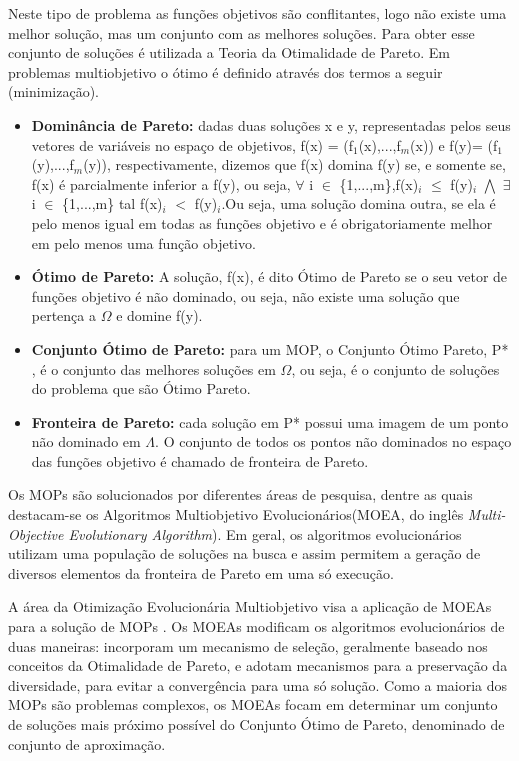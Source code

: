 Neste tipo de problema as funções objetivos são conflitantes, logo não existe uma melhor solução, mas um conjunto com as melhores soluções. Para obter esse conjunto de soluções é utilizada a Teoria da Otimalidade de Pareto\cite{coello2007evolutionary}. Em problemas multiobjetivo o ótimo é definido através dos termos a seguir (minimização).
 \begin{itemize}
   \item \textbf{Dominância de Pareto:} dadas duas soluções x e y, representadas pelos seus vetores de variáveis no espaço de objetivos, f(x) = (f$_{1}$(x),...,f$_{m}$(x)) e f(y)= (f$_{1}$(y),...,f$_{m}$(y)), respectivamente, dizemos que f(x) domina f(y) se, e somente se, f(x) é parcialmente inferior a f(y), ou seja, $\forall$ i $\in$ \{1,...,m\},f(x)$_{i}$ $\leq$ f(y)$_{i}$ $\bigwedge$  $\exists$ i $\in$ \{1,...,m\} tal  f(x)$_{i}$ $<$ f(y)$_{i}$.Ou seja, uma solução domina outra, se ela é pelo menos igual em todas as funções objetivo e é obrigatoriamente melhor em pelo menos uma função objetivo. 
   \item \textbf{Ótimo de Pareto:} A solução, f(x), é dito Ótimo de Pareto se o seu vetor de funções objetivo é não dominado, ou seja, não existe uma solução que pertença a $\Omega$ e domine f(y).
   \item \textbf{Conjunto Ótimo de Pareto:} para um MOP, o Conjunto Ótimo Pareto, P* , é o conjunto das melhores soluções em $\Omega$, ou seja, é o conjunto de soluções do problema que são Ótimo Pareto.
   \item \textbf{Fronteira de Pareto:} cada solução em P* possui uma imagem de um ponto não dominado em  $\Lambda$. O conjunto de todos os pontos não dominados no espaço das funções objetivo é chamado de fronteira de Pareto.
 \end{itemize}
Os MOPs são solucionados por diferentes áreas de pesquisa, dentre as quais destacam-se os Algoritmos Multiobjetivo Evolucionários(MOEA, do inglês \textit{Multi-Objective Evolutionary Algorithm}). Em geral, os algoritmos evolucionários utilizam uma população de soluções na busca e assim permitem a geração de diversos elementos da fronteira de Pareto em uma só execução.
 
 A área da Otimização Evolucionária Multiobjetivo visa a aplicação de MOEAs para a solução de MOPs \cite{carvalho2013novas}. Os MOEAs modificam os algoritmos evolucionários de duas maneiras: incorporam um mecanismo de seleção, geralmente baseado nos conceitos da Otimalidade de Pareto, e adotam mecanismos para a preservação da diversidade, para evitar a convergência para uma só solução. Como a maioria dos MOPs são problemas complexos, os MOEAs focam em determinar um conjunto de soluções mais próximo possível do Conjunto Ótimo de Pareto, denominado de conjunto de aproximação.
 

